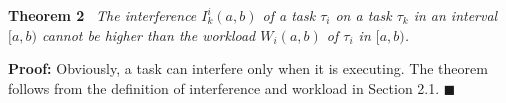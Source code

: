 \textbf{Theorem 2} \ \textit{The interference $I_k^i(a,b)$ of a task $\tau_i$ on a task $\tau_k$ in an interval $[a,b)$ cannot be higher than the workload $W_i(a,b)$ of $\tau_i$ in $[a,b)$.}

\bigskip

\noindent
\textbf{Proof:} Obviously, a task can interfere only when it is executing. The theorem follows from the definition of interference and workload in Section 2.1. \hfill $\blacksquare$